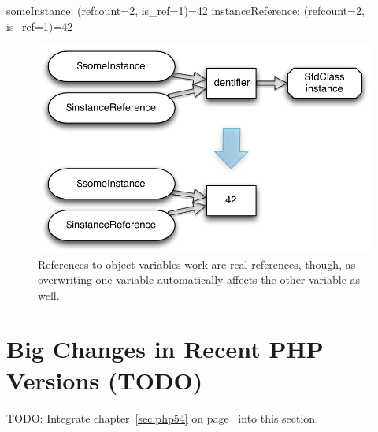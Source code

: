 
\begin{textcode}
someInstance: (refcount=2, is_ref=1)=42
instanceReference: (refcount=2, is_ref=1)=42
\end{textcode}

\begin{figure}[!h]
  \begin{center}
    \includegraphics[scale=0.8]{images/someInstance_instanceReference}
    \caption{References to object variables work are real references, though, as overwriting one variable automatically affects the other variable as well.}
    \label{fig:real-object-references}
  \end{center}
\end{figure}


\section{Big Changes in Recent PHP Versions (TODO)}
TODO: Integrate chapter~\ref{sec:php54} on page~\pageref{sec:php54} into this section.
